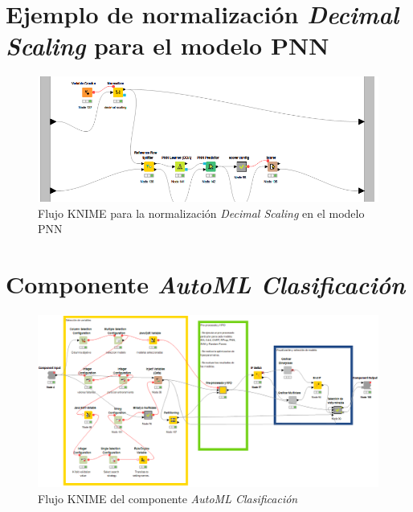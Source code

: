 \chapter{Ejemplo de normalización \textit{Decimal Scaling} para el modelo PNN}\label{aped:12}

\begin{figure}[H]
	\centering
	\includegraphics[width=\textwidth]{"figuras/anexos/ejemplo normalizacion pnn decimal scaling"}
	\caption{Flujo KNIME para la normalización \textit{Decimal Scaling} en el modelo PNN}
	\label{anex:ejemplo-normalizacion-pnn-decimal-scaling}
\end{figure}

\chapter{Componente \textit{AutoML Clasificación}} \label{aped:13}

\begin{figure}[H]
	\centering
	\includegraphics[width=\textwidth]{"figuras/anexos/componente integrado"}
	\caption{Flujo KNIME del componente \textit{AutoML Clasificación}}
	\label{anex:componente-integrado}
\end{figure}

